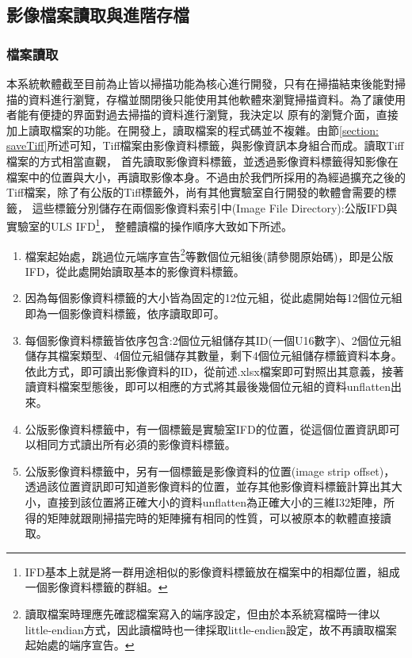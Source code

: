 \documentclass[12pt]{article}
\begin{document}
\subsection{影像檔案讀取與進階存檔}
\subsubsection{檔案讀取}
本系統軟體截至目前為止皆以掃描功能為核心進行開發，只有在掃描結束後能對掃描的資料進行瀏覽，存檔並關閉後只能使用其他軟體來瀏覽掃描資料。為了讓使用者能有便捷的界面對過去掃描的資料進行瀏覽，我決定以
原有的瀏覽介面，直接加上讀取檔案的功能。在開發上，讀取檔案的程式碼並不複雜。由節\ref{section: saveTiff}所述可知，Tiff檔案由影像資料標籤，與影像資訊本身組合而成。讀取Tiff檔案的方式相當直觀，
首先讀取影像資料標籤，並透過影像資料標籤得知影像在檔案中的位置與大小，再讀取影像本身。不過由於我們所採用的為經過擴充之後的Tiff檔案，除了有公版的Tiff標籤外，尚有其他實驗室自行開發的軟體會需要的標籤，
這些標籤分別儲存在兩個影像資料索引中(Image File Directory):公版IFD與實驗室的ULS IFD\footnote{IFD基本上就是將一群用途相似的影像資料標籤放在檔案中的相鄰位置，組成一個影像資料標籤的群組。}，
整體讀檔的操作順序大致如下所述。
\begin{enumerate}
    \item 檔案起始處，跳過位元端序宣告\footnote{讀取檔案時理應先確認檔案寫入的端序設定，但由於本系統寫檔時一律以little-endian方式，因此讀檔時也一律採取little-endien設定，故不再讀取檔案起始處的端序宣告。}等數個位元組後(請參閱原始碼)，即是公版IFD，從此處開始讀取基本的影像資料標籤。
    \item 因為每個影像資料標籤的大小皆為固定的12位元組，從此處開始每12個位元組即為一個影像資料標籤，依序讀取即可。
    \item 每個影像資料標籤皆依序包含:2個位元組儲存其ID(一個U16數字)、2個位元組儲存其檔案類型、4個位元組儲存其數量，剩下4個位元組儲存標籤資料本身。依此方式，即可讀出影像資料的ID，從前述.xlsx檔案即可對照出其意義，接著讀資料檔案型態後，即可以相應的方式將其最後幾個位元組的資料unflatten出來。
    \item 公版影像資料標籤中，有一個標籤是實驗室IFD的位置，從這個位置資訊即可以相同方式讀出所有必須的影像資料標籤。
    \item 公版影像資料標籤中，另有一個標籤是影像資料的位置(image strip offset)，透過該位置資訊即可知道影像資料的位置，並存其他影像資料標籤計算出其大小，直接到該位置將正確大小的資料unflatten為正確大小的三維I32矩陣，所得的矩陣就跟剛掃描完時的矩陣擁有相同的性質，可以被原本的軟體直接讀取。
\end{enumerate}
\end{document}

